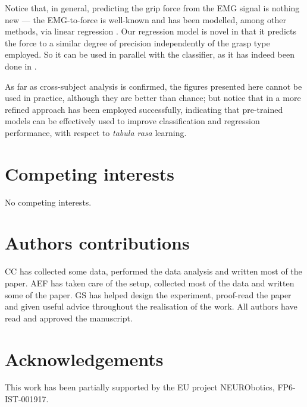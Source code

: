 \documentclass[10pt]{bmc_article}
\newenvironment{bmcformat}{\begin{raggedright}\baselineskip20pt\sloppy\setboolean{publ}{false}}{\end{raggedright}\baselineskip20pt\sloppy}
\begin{document}
\begin{bmcformat}
Notice that, in general, predicting the grip force from the EMG signal
is nothing new --- the EMG-to-force is well-known and has been modelled,
among other methods, via linear regression \cite{Hoozemans05}. Our regression model
is novel in that it predicts the force to a similar degree of precision
independently of the grasp type employed. So it can be used in parallel
with the classifier, as it has indeed been done in \cite{2008.BioCyb}.

As far as cross-subject analysis is confirmed, the figures presented here
cannot be used in practice, although they are better than chance; but notice
that in \cite{2009.ICRA} a more refined approach has been employed successfully,
indicating that pre-trained models can be effectively used to improve
classification and regression performance, with respect to \emph{tabula rasa}
learning.

\section*{Competing interests}

No competing interests.

\section*{Authors contributions}

CC has collected some data, performed the data analysis and written most of the
paper. AEF has taken care of the setup, collected most of the data and written
some of the paper. GS has helped design the experiment, proof-read the paper
and given useful advice throughout the realisation of the work. All authors
have read and approved the manuscript.

\section*{Acknowledgements}

This work has been partially supported by the EU project NEURObotics, FP6-IST-001917.

{
   }     %



\end{bmcformat}
\end{document}
